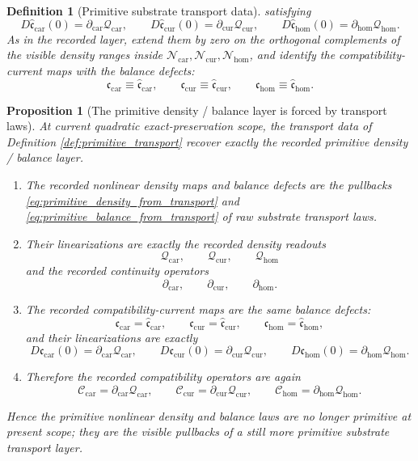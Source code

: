 \documentclass[11pt]{article}
\newcommand{\TensorCompat}{\mathcal C_{\mathrm{car}}}
\newcommand{\CurCompat}{\mathcal C_{\mathrm{cur}}}
\newcommand{\HomCompat}{\mathcal C_{\mathrm{hom}}}
\newcommand{\TensorCurrent}{\mathfrak c_{\mathrm{car}}}
\newcommand{\CurCurrent}{\mathfrak c_{\mathrm{cur}}}
\newcommand{\HomCurrent}{\mathfrak c_{\mathrm{hom}}}
\newcommand{\TensorDensityClass}{\mathscr N_{\mathrm{car}}}
\newcommand{\CurDensityClass}{\mathscr N_{\mathrm{cur}}}
\newcommand{\HomDensityClass}{\mathscr N_{\mathrm{hom}}}
\newcommand{\TensorDensity}{\mathcal Q_{\mathrm{car}}}
\newcommand{\CurDensity}{\mathcal Q_{\mathrm{cur}}}
\newcommand{\HomDensity}{\mathcal Q_{\mathrm{hom}}}
\newcommand{\TensorCont}{\partial_{\mathrm{car}}}
\newcommand{\CurCont}{\partial_{\mathrm{cur}}}
\newcommand{\HomCont}{\partial_{\mathrm{hom}}}
\newcommand{\TensorBalance}{\widehat{\mathfrak c}_{\mathrm{car}}}
\newcommand{\CurBalance}{\widehat{\mathfrak c}_{\mathrm{cur}}}
\newcommand{\HomBalance}{\widehat{\mathfrak c}_{\mathrm{hom}}}
\newtheorem{definition}{Definition}
\newtheorem{proposition}{Proposition}
\begin{document}
\begin{definition}[Primitive substrate transport data]
satisfying
\begin{equation}
D\TensorBalance(0)=\TensorCont\TensorDensity,\qquad
D\CurBalance(0)=\CurCont\CurDensity,\qquad
D\HomBalance(0)=\HomCont\HomDensity.
\label{eq:transport_balance_factorization}
\end{equation}
As in the recorded layer, extend them by zero on the orthogonal complements of the visible density ranges inside \(\TensorDensityClass,\CurDensityClass,\HomDensityClass\), and identify the compatibility-current maps with the balance defects:
\begin{equation}
\TensorCurrent\equiv\TensorBalance,\qquad
\CurCurrent\equiv\CurBalance,\qquad
\HomCurrent\equiv\HomBalance.
\label{eq:transport_currents}
\end{equation}
\end{definition}

\begin{proposition}[The primitive density / balance layer is forced by transport laws]
\label{prop:balance_from_transport}
At current quadratic exact-preservation scope, the transport data of Definition \ref{def:primitive_transport} recover exactly the recorded primitive density / balance layer.
\begin{enumerate}
    \item The recorded nonlinear density maps and balance defects are the pullbacks \eqref{eq:primitive_density_from_transport} and \eqref{eq:primitive_balance_from_transport} of raw substrate transport laws.
    \item Their linearizations are exactly the recorded density readouts
    \[
    \TensorDensity,\qquad
    \CurDensity,\qquad
    \HomDensity
    \]
    and the recorded continuity operators
    \[
    \TensorCont,\qquad
    \CurCont,\qquad
    \HomCont.
    \]
    \item The recorded compatibility-current maps are the same balance defects:
    \[
    \TensorCurrent=\TensorBalance,\qquad
    \CurCurrent=\CurBalance,\qquad
    \HomCurrent=\HomBalance,
    \]
    and their linearizations are exactly
    \begin{equation}
    D\TensorCurrent(0)=\TensorCont\TensorDensity,\qquad
    D\CurCurrent(0)=\CurCont\CurDensity,\qquad
    D\HomCurrent(0)=\HomCont\HomDensity.
    \label{eq:currents_from_transport}
    \end{equation}
    \item Therefore the recorded compatibility operators are again
    \begin{equation}
    \TensorCompat=\TensorCont\TensorDensity,\qquad
    \CurCompat=\CurCont\CurDensity,\qquad
    \HomCompat=\HomCont\HomDensity.
    \label{eq:compat_from_transport}
    \end{equation}
\end{enumerate}
Hence the primitive nonlinear density and balance laws are no longer primitive at present scope; they are the visible pullbacks of a still more primitive substrate transport layer.
\end{proposition}
\end{document}
